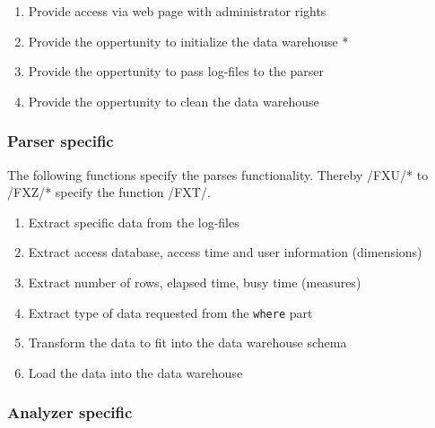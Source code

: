 \begin{enumerate}[resume]
  
  \item Provide access via web page with administrator rights
   
  \item Provide the oppertunity to initialize the data warehouse * %
   
  \item Provide the oppertunity to pass log-files to the parser
  
  \item Provide the oppertunity to clean the data warehouse
   
\end{enumerate}


\subsubsection*{Parser specific} 
 
 The following functions specify the parses functionality. Thereby /FXU/* to /FXZ/* specify
 the function /FXT/.
 
\begin{enumerate}[resume]
  
  \item Extract specific data from the log-files
  
  \item Extract access database, access time and user information (dimensions) %
  
  \item Extract number of rows, elapsed time, busy time (measures) %
  
  \item Extract type of data requested from the \texttt{where} part %
  
  \item Transform the data to fit into the data warehouse schema
  
  \item Load the data into the data warehouse

\end{enumerate}

\subsubsection*{Analyzer specific} 
 
